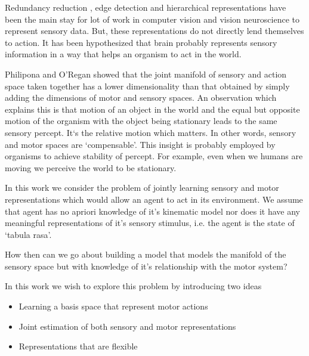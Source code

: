 \documentclass[conference]{IEEEtran}
\begin{document}

\IEEEpeerreviewmaketitle

Redundancy reduction \cite{barlow1961possible}, edge detection \cite{hubel1968receptive}  and hierarchical representations \cite{krizhevsky2012imagenet} have been the main stay for lot of work in computer vision and vision neuroscience to represent sensory data. But, these representations do not directly lend themselves to action. It has been hypothesized \cite{o2001sensorimotor} that brain probably represents sensory information in a way that helps an organism to act in the world.  

Philipona and O'Regan \cite{philipona2003there,philipona2003perception} showed that the joint manifold of sensory and action space taken together has a lower dimensionality than that obtained by simply adding the dimensions of motor and sensory spaces. An observation which explains this is that motion of an object in the world and the equal but opposite motion of the organism with the object being stationary leads to the same sensory percept. It`s the relative motion which matters. In other words, sensory and motor spaces are `compensable'. This insight is probably employed by organisms to achieve stability of percept. For example, even when we humans are moving we perceive the world to be stationary. 

In this work we consider the problem of jointly learning sensory and motor representations which would allow an agent to act in its environment. We assume that agent has no apriori knowledge of it's kinematic model nor does it have any meaningful representations of it's sensory stimulus, i.e. the agent is the state of `tabula rasa'.  

How then can we go about building a model that models the manifold of the sensory space but with knowledge of it's relationship with the motor system? 

In this work we wish to explore this problem by introducing two ideas 
\begin{itemize}
\item Learning a basis space that represent motor actions 
\item Joint estimation of both sensory and motor representations
\item Representations that are flexible
\end{itemize}
\end{document}
